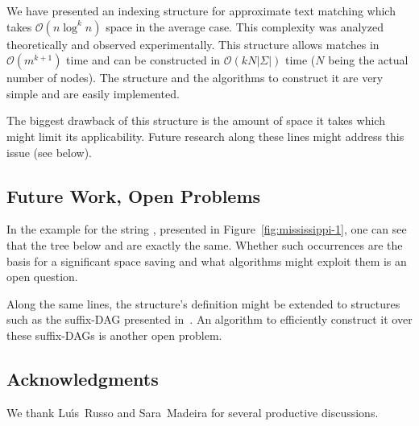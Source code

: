 We have presented an indexing structure for approximate text matching which takes $\mathcal{O}(n\log^k n)$ space in the average case. This complexity was analyzed theoretically and observed experimentally. This structure allows matches in $\mathcal{O}(m^{k+1})$ time and can be constructed in $\mathcal{O}(kN|\Sigma|)$ time ($N$ being the actual number of nodes). The structure and the algorithms to construct it are very simple and are easily implemented.

The biggest drawback of this structure is the amount of space it takes which might limit its applicability. Future research along these lines might address this issue (see below). 

\subsection{Future Work, Open Problems}\label{sec:future}

In the example for the string , presented in Figure~\ref{fig:mississippi-1}, one can see that the tree below  and  are exactly the same. Whether such occurrences are the basis for a significant space saving and what algorithms might exploit them is an open question.

Along the same lines, the structure's definition might be extended to structures such as the suffix-DAG presented in~\cite[\S\,7.7]{gusfield:algorithms}. An algorithm to efficiently construct it over these suffix-DAGs is another open problem.

\subsection{Acknowledgments}

We thank Lu\'{\i}s~Russo and Sara~Madeira for several productive discussions.
